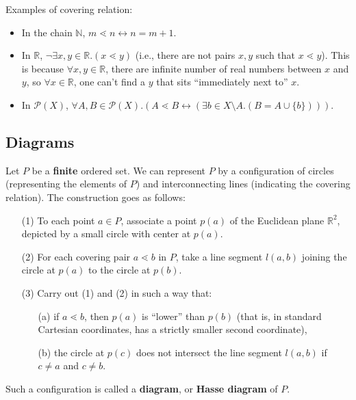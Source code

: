 \documentclass[12pt, letterpaper, oneside]{book}
\begin{document}
Examples of covering relation:
\begin{itemize}
  \item In the chain $\mathbb{N}$, $m \lessdot n \leftrightarrow n = m + 1$.
  \item In $\mathbb{R}$, $\lnot \exists x, y \in \mathbb{R}. (x \lessdot y)$ (i.e., there are not pairs $x, y$ such
        that $x \lessdot y$). This is because $\forall x, y \in \mathbb{R}$, there are infinite number of real numbers
        between $x$ and $y$, so $\forall x \in \mathbb{R}$, one can't find a $y$ that sits ``immediately next to'' $x$.
  \item In $\mathcal{P}(X)$, $\forall A, B \in \mathcal{P}(X). (A \lessdot B \leftrightarrow (\exists b \in X \setminus
          A. (B = A \cup \{b\})))$.
\end{itemize}

\subsection{Diagrams}

Let $P$ be a \textbf{finite} ordered set. We can represent $P$ by a configuration of circles (representing the elements
of $P$) and interconnecting lines (indicating the covering relation). The construction goes as follows:
\begin{enumerate}
  \item[(1)] To each point $a \in P$, associate a point $p(a)$ of the Euclidean plane $\mathbb{R}^2$, depicted by a
        small circle with center at $p(a)$.
  \item[(2)] For each covering pair $a \lessdot b$ in $P$, take a line segment $l(a,b)$ joining the circle at $p(a)$ to
        the circle at $p(b)$.
  \item[(3)] Carry out (1) and (2) in such a way that:
        \begin{enumerate}
          \item[(a)] if $a \lessdot b$, then $p(a)$ is ``lower'' than $p(b)$ (that is, in standard Cartesian coordinates,
                has a strictly smaller second coordinate),
          \item[(b)] the circle at $p(c)$ does not intersect the line segment $l(a,b)$ if $c \ne a$ and $c \ne b$.
        \end{enumerate}
\end{enumerate}

Such a configuration is called a \textbf{diagram}, or \textbf{Hasse diagram} of $P$.
\end{document}
